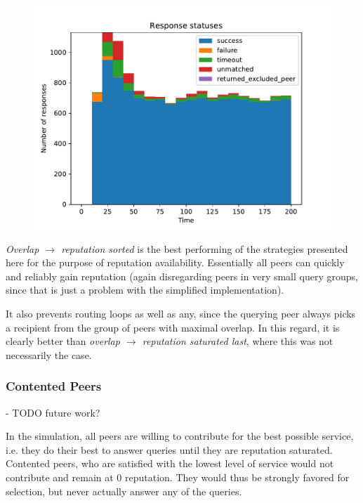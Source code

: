 \begin{figure}[t]
\centering
\includegraphics[width=1\columnwidth]{figures/selection_overlap_rep_sorted_resp_statuses}
\label{fig:selection_overlap_rep_sorted_resp_statuses}
\end{figure}

\emph{Overlap $\rightarrow$ reputation sorted} is the best performing of the
strategies presented here for the purpose of reputation availability.
Essentially all peers can quickly and reliably gain reputation (again
disregarding peers in very small query groups, since that is just a problem with
the simplified implementation).

It also prevents routing loops as well as any, since the querying peer always
picks a recipient from the group of peers with maximal overlap. In this regard,
it is clearly better than \emph{overlap $\rightarrow$ reputation saturated
last}, where this was not necessarily the case.

\subsubsection{Contented Peers}
\label{sec:rep_avail_selection_rep_sorted_contented}
- TODO future work?

In the simulation, all peers are willing to contribute for the best possible
service, i.e. they do their best to answer queries until they are reputation
saturated. Contented peers, who are satisfied with the lowest level of service
would not contribute and remain at 0 reputation. They would thus be strongly
favored for selection, but never actually answer any of the queries.

